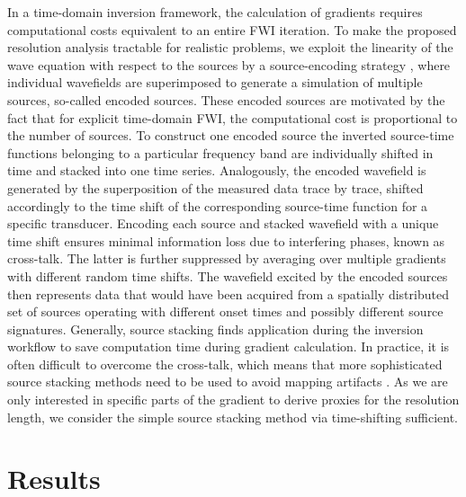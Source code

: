 \documentclass[12pt]{iopart}
\begin{document}
In a time-domain inversion framework, the calculation of gradients requires computational costs equivalent to an entire FWI iteration. To make the proposed resolution analysis tractable for realistic problems, we exploit the linearity of the wave equation with respect to the sources by a source-encoding strategy \cite{Capdeville_2005,Krebs_2009,Matharu_Sacchi_2018}, where individual wavefields are superimposed to generate a simulation of multiple sources, so-called encoded sources. These encoded sources are motivated by the fact that for explicit time-domain FWI, the computational cost is proportional to the number of sources. To construct one encoded source the inverted source-time functions belonging to a particular frequency band are individually shifted in time and stacked into one time series. Analogously, the encoded wavefield is generated by the superposition of the measured data trace by trace, shifted accordingly to the time shift of the corresponding source-time function for a specific transducer. Encoding each source and stacked wavefield with a unique time shift ensures minimal information loss due to interfering phases, known as cross-talk. The latter is further suppressed by averaging over multiple gradients with different random time shifts. The wavefield excited by the encoded sources then represents data that would have been acquired from a spatially distributed set of sources operating with different onset times and possibly different source signatures. Generally, source stacking finds application during the inversion workflow to save computation time during gradient calculation. In practice, it is often difficult to overcome the cross-talk, which means that more sophisticated source stacking methods need to be used to avoid mapping artifacts \cite{Tromp_Bachmann_2019}. As we are only interested in specific parts of the gradient to derive proxies for the resolution length, we consider the simple source stacking method via time-shifting sufficient. 

\section{Results}
\label{sec:results}
\end{document}
